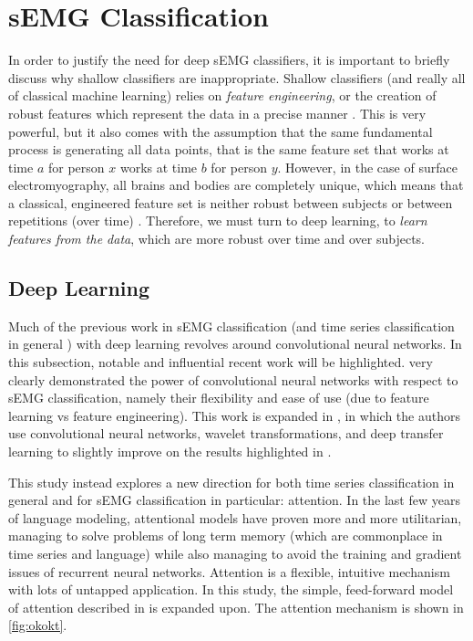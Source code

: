 \section{sEMG Classification}

In order to justify the need for deep sEMG classifiers, it is important to briefly discuss why shallow classifiers are inappropriate. Shallow classifiers (and really all of classical machine learning) relies on \emph{feature engineering}, or the creation of robust features which represent the data in a precise manner \cite{bddl}. This is very powerful, but it also comes with the assumption that the same fundamental process is generating all data points, that is the same feature set that works at time $a$ for person $x$ works at time $b$ for person $y$. However, in the case of surface electromyography, all brains and bodies are completely unique, which means that a classical, engineered feature set is neither robust between subjects or between repetitions (over time) \cite{dlot}. Therefore, we must turn to deep learning, to \emph{learn features from the data}, which are more robust over time and over subjects.

\subsection{Deep Learning}

Much of the previous work in sEMG classification (and time series classification in general \cite{dltsr}) with deep learning revolves around convolutional neural networks. In this subsection, notable and influential recent work will be highlighted. \cite{atz_cnn} very clearly demonstrated the power of convolutional neural networks with respect to sEMG classification, namely their flexibility and ease of use (due to feature learning vs feature engineering). This work is expanded in \cite{primary}, in which the authors use convolutional neural networks, wavelet transformations, and deep transfer learning to slightly improve on the results highlighted in \cite{atz_cnn}. \par
This study instead explores a new direction for both time series classification in general and for sEMG classification in particular: attention. In the last few years of language modeling, attentional models have proven more and more utilitarian, managing to solve problems of long term memory (which are commonplace in time series and language) while also managing to avoid the training and gradient issues of recurrent neural networks. Attention is a flexible, intuitive mechanism with lots of untapped application. In this study, the simple, feed-forward model of attention  described in \cite{raffel2015feedforward} is expanded upon. The attention mechanism is shown in \autoref{fig:okokt}. 


